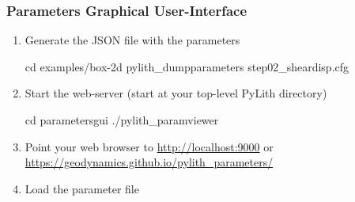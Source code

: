 \documentclass[aspectratio=169]{beamer}
\begin{document}
\begin{frame}[fragile]
  \frametitle{Parameters Graphical User-Interface}

  \begin{enumerate}
  \item Generate the JSON file with the parameters
    \begin{bashcode}
      cd examples/box-2d
      pylith_dumpparameters step02_sheardisp.cfg
    \end{bashcode}
  \item Start the web-server (start at your top-level PyLith directory)
    \begin{bashcode}
      cd parametersgui
      ./pylith_paramviewer
    \end{bashcode}
  \item Point your web browser to \url{http://localhost:9000} or \url{https://geodynamics.github.io/pylith_parameters/}
  \item Load the parameter file
  \end{enumerate}

\end{frame}
\end{document}
